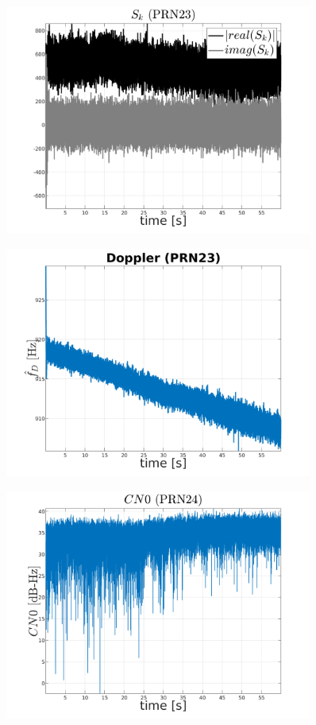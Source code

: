 \begin{figure}[H]
	\centering
	\includegraphics[width=0.9\textwidth]{fig/sk_PRN23.png}
\end{figure}

\begin{figure}[H]
	\centering
	\includegraphics[width=0.9\textwidth]{fig/doppler_PRN23.png}
\end{figure}

\begin{figure}[H]
	\centering
	\includegraphics[width=0.9\textwidth]{fig/CN0_PRN24.png}
\end{figure}

